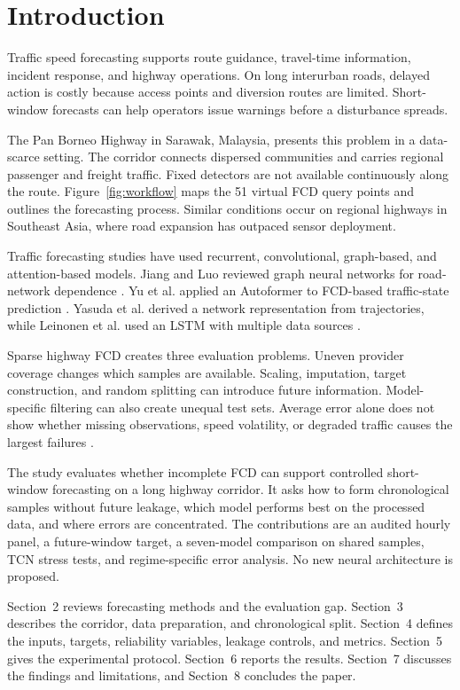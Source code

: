 \documentclass[smallcondensed]{svjour3}
\begin{document}
\section{Introduction}
Traffic speed forecasting supports route guidance, travel-time information, incident response, and highway operations. On long interurban roads, delayed action is costly because access points and diversion routes are limited. Short-window forecasts can help operators issue warnings before a disturbance spreads.

The Pan Borneo Highway in Sarawak, Malaysia, presents this problem in a data-scarce setting. The corridor connects dispersed communities and carries regional passenger and freight traffic. Fixed detectors are not available continuously along the route. Figure~\ref{fig:workflow} maps the 51 virtual FCD query points and outlines the forecasting process. Similar conditions occur on regional highways in Southeast Asia, where road expansion has outpaced sensor deployment.

Traffic forecasting studies have used recurrent, convolutional, graph-based, and attention-based models. Jiang and Luo reviewed graph neural networks for road-network dependence \cite{ref1}. Yu et al. applied an Autoformer to FCD-based traffic-state prediction \cite{ref4}. Yasuda et al. derived a network representation from trajectories, while Leinonen et al. used an LSTM with multiple data sources \cite{ref5,ref6}.

Sparse highway FCD creates three evaluation problems. Uneven provider coverage changes which samples are available. Scaling, imputation, target construction, and random splitting can introduce future information. Model-specific filtering can also create unequal test sets. Average error alone does not show whether missing observations, speed volatility, or degraded traffic causes the largest failures \cite{ref9,ref11}.

The study evaluates whether incomplete FCD can support controlled short-window forecasting on a long highway corridor. It asks how to form chronological samples without future leakage, which model performs best on the processed data, and where errors are concentrated. The contributions are an audited hourly panel, a future-window target, a seven-model comparison on shared samples, TCN stress tests, and regime-specific error analysis. No new neural architecture is proposed.

Section~2 reviews forecasting methods and the evaluation gap. Section~3 describes the corridor, data preparation, and chronological split. Section~4 defines the inputs, targets, reliability variables, leakage controls, and metrics. Section~5 gives the experimental protocol. Section~6 reports the results. Section~7 discusses the findings and limitations, and Section~8 concludes the paper.
\end{document}
